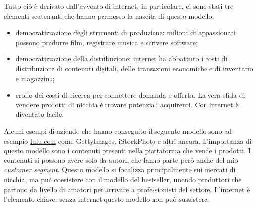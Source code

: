 Tutto ciò è derivato dall'avvento di internet: in particolare, ci sono stati
tre elementi scatenanti che hanno permesso la nascita di questo modello:
\begin{itemize}
 \item democratizzazione degli strumenti di produzione: milioni di appassionati
possono produrre film, registrare musica e scrivere software;
 \item democratizzazione della distribuzione: internet ha abbattuto i costi di
distribuzione di contenuti digitali, delle transazioni economiche e di
inventario e magazzino;
 \item crollo dei costi di ricerca per connettere domanda e offerta. La vera
sfida di vendere prodotti di nicchia è trovare potenziali acquirenti. Con
internet è diventato facile.
\end{itemize}

Alcuni esempi di aziende che hanno conseguito il seguente modello sono ad
esempio \url{lulu.com} come GettyImages, iStockPhoto e altri ancora.
L'importanza di questo modello sono i contenuti presenti nella piattaforma che
vende i prodotti. I contenuti si possono avere solo da autori, che fanno parte
però anche del mio \textit{customer segment}. Questo modello si focalizza
principalmente sui mercati di nicchia, ma può coesistere con il modello del
bestseller, unendo produttori che partono da livello di amatori per arrivare a
professionisti del settore. L'internet è l'elemento chiave: senza internet
questo modello non può sussistere.

